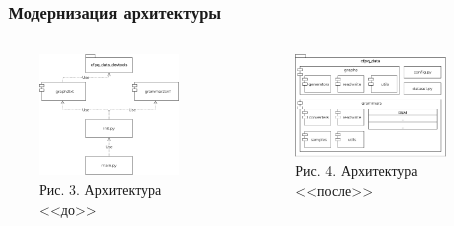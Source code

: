 \begin{frame}[fragile]
	\transwipe[direction=90]
	\frametitle{\faCogs\ Модернизация архитектуры}
	
	\begin{columns}
        \begin{column}{0.5\textwidth}
            \begin{figure}[hbt!]{\textwidth}
				\centering
				\includegraphics[width=0.9\textwidth]{img/architecture_old.pdf}
				\caption*{Рис. 3. Архитектура <<до>>} \label{fig:architecture_old}
			\end{figure}
        \end{column}

        \begin{column}{0.5\textwidth}
            \begin{figure}[hbt!]{\textwidth}
				\centering
				\includegraphics[width=0.9\textwidth]{img/architecture_new.pdf}
				\caption*{Рис. 4. Архитектура <<после>>} \label{fig:architecture_new}
			\end{figure}
        \end{column}
    \end{columns}
\end{frame}
